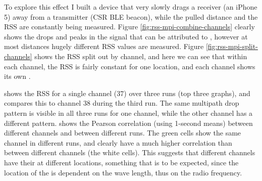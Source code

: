 To explore this effect I built a device that very slowly drags a receiver (an iPhone 5) away from a transmitter (CSR BLE beacon), while the pulled distance and the RSS are constantly being measured.
Figure \ref{fig:rss-mpi-combine-channels} clearly shows the drops and peaks in the signal that can be attributed to \mpi, however at most distances hugely different RSS values are measured.
Figure \ref{fig:rss-mpi-split-channels} shows the RSS split out by channel, and here we can see that within each channel, the RSS is fairly constant for one location, and each channel shows its own \mpids.

 shows the RSS for a single channel (37) over three runs (top three graphs), and compares this to channel 38 during the third run.
The same multipath drop pattern is visible in all three runs for one channel, while the other channel has a different pattern.
 shows the Pearson correlation (using 1-second means) between different channels and between different runs.
The green cells show the same channel in different runs, and clearly have a much higher correlation than between different channels (the white cells).
This suggests that different channels have their \mpids at different locations, something that is to be expected, since the location of the \mpids is dependent on the wave length, thus on the radio frequency.


